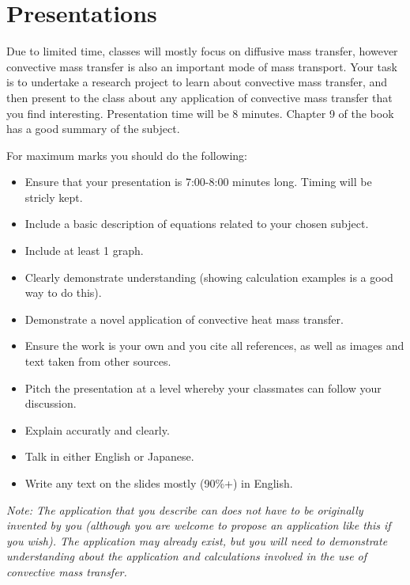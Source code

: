 \newpage
\section{Presentations}
Due to limited time, classes will mostly focus on diffusive mass transfer, however convective mass transfer is also an important mode of mass transport. Your task is to undertake a research project to learn about convective mass transfer, and then present to the class about any application of convective mass transfer that you find interesting. Presentation time will be 8 minutes. Chapter 9 of the book has a good summary of the subject.

For maximum marks you should do the following:

\begin{itemize}
    \item Ensure that your presentation is 7:00-8:00 minutes long. Timing will be stricly kept.
    \item Include a basic description of equations related to your chosen subject.
    \item Include at least 1 graph.
    \item Clearly demonstrate understanding (showing calculation examples is a good way to do this).
    \item Demonstrate a novel application of convective heat mass transfer.
    \item Ensure the work is your own and you cite all references, as well as images and text taken from other sources.
    \item Pitch the presentation at a level whereby your classmates can follow your discussion.
    \item Explain accuratly and clearly.
    \item Talk in either English or Japanese.
    \item Write any text on the slides mostly (90\%+) in English.
\end{itemize}

\emph{Note: The application that you describe can does not have to be originally invented by you (although you are welcome to propose an application like this if you wish). The application may already exist, but you will need to demonstrate understanding about the application and calculations involved in the use of convective mass transfer.}
